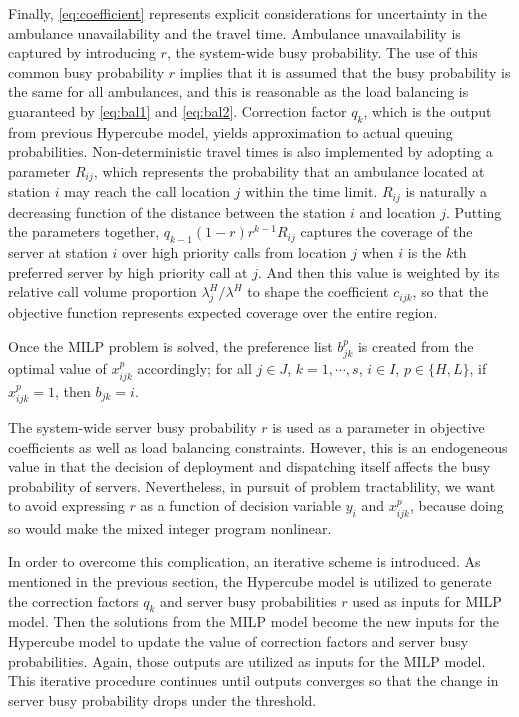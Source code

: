 \documentclass{article}
\begin{document}
Finally, \eqref{eq:coefficient} represents explicit considerations for uncertainty in the ambulance unavailability and the travel time. Ambulance unavailability is captured by introducing $r$, the system-wide busy probability. The use of this common busy probability $r$ implies that it is assumed that the busy probability is the same for all ambulances, and this is reasonable as the load balancing is guaranteed by \eqref{eq:bal1} and \eqref{eq:bal2}. Correction factor $q_k$, which is the output from previous Hypercube model, yields approximation to actual queuing probabilities. Non-deterministic travel times is also implemented by adopting a parameter $R_{ij}$, which represents the probability that an ambulance located at station $i$ may reach the call location $j$ within the time limit. $R_{ij}$ is naturally a decreasing function of the distance between the station $i$ and location $j$. Putting the parameters together, $q_{k-1}(1-r) r^{k-1} R_{ij}$ captures the coverage of the server at station $i$ over high priority calls from location $j$ when $i$ is the $k$th preferred server by high priority call at $j$. And then this value is weighted by its relative call volume proportion $\lambda_j^H/\lambda^H$ to shape the coefficient $c_{ijk}$, so that the objective function represents expected coverage over the entire region.

Once the MILP problem is solved, the preference list $b^p_{jk}$ is created from the optimal value of $x^p_{ijk}$ accordingly; for all $j \in J$, $k=1,\cdots,s$, $i\in I$, $p \in \{H,L\}$, if $x^p_{ijk}=1$, then $b_{jk}=i$.

The system-wide server busy probability $r$ is used as a parameter in objective coefficients as well as load balancing constraints. However, this is an endogeneous value in that the decision of deployment and dispatching itself affects the busy probability of servers. Nevertheless, in pursuit of problem tractablility, we want to avoid expressing $r$ as a function of decision variable $y_i$ and $x^p_{ijk}$, because doing so would make the mixed integer program nonlinear. 

In order to overcome this complication, an iterative scheme is introduced. As mentioned in the previous section, the Hypercube model is utilized to generate the correction factors $q_k$ and server busy probabilities $r$ used as inputs for MILP model. Then the solutions from the MILP model become the new inputs for the Hypercube model to update the value of correction factors and server busy probabilities. Again, those outputs are utilized as inputs for the MILP model. This iterative procedure continues until outputs converges so that the change in server busy probability drops under the threshold.
\end{document}
